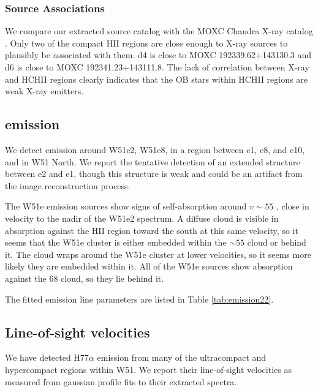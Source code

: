 \subsubsection{Source Associations}
We compare our extracted source catalog with the MOXC Chandra X-ray
catalog \citep{Townsley2014a}.  Only two of the compact HII regions are close
enough to X-ray sources to plausibly be associated with them.  d4 is close to
MOXC 192339.62+143130.3 and d6 is close to MOXC 192341.23+143111.8.  The lack
of correlation between X-ray and HCHII regions clearly indicates that the OB
stars within HCHII regions are weak X-ray emitters.




\subsection{\formaldehyde \twotwo emission}
\label{sec:twotwoemission}
We detect \formaldehyde \twotwo emission around W51e2, W51e8, in a region
between e1, e8, and e10, and in W51 North.  We report the tentative detection
of an extended structure between e2 and e1, though this structure is weak
and could be an artifact from the image reconstruction process.

The W51e emission sources show signs of self-absorption around $v\sim55$ \kms,
close in velocity to the nadir of the W51e2 spectrum.  A diffuse cloud is
visible in absorption against the HII region toward the south at this same
velocity, so it seems that the W51e cluster is either embedded within the
$\sim55$ \kms cloud or behind it.  The cloud wraps around the W51e cluster at
lower velocities, so it seems more likely they are embedded within it.  All of
the W51e sources show absorption against the 68 \kms cloud, so they lie behind
it.

The fitted emission line parameters are listed in Table \ref{tab:emission22}.



\subsection{Line-of-sight velocities}
\label{sec:LOSvelo}
We have detected H77$\alpha$ emission from many of the ultracompact and
hypercompact \hii regions within W51.  We report their line-of-sight velocities
as measured from gaussian profile fits to their extracted spectra.

